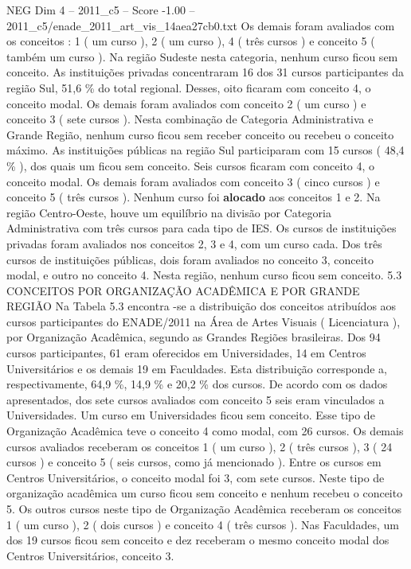 \begin{textsample}{NEG Dim 4 – 2011\_c5 – Score -1.00 – 2011\_c5/enade\_2011\_art\_vis\_14aea27cb0.txt}
Os demais foram avaliados com os conceitos : 1 ( um curso ), 2 ( um curso ), 4 ( três cursos ) e conceito 5 ( também um curso ).
Na região Sudeste nesta categoria, nenhum curso ficou sem conceito.
As instituições privadas concentraram 16 dos 31 cursos participantes da região Sul, 51,6 \% do total regional.
Desses, oito ficaram com conceito 4, o conceito modal.
Os demais foram avaliados com conceito 2 ( um curso ) e conceito 3 ( sete cursos ).
Nesta combinação de Categoria Administrativa e Grande Região, nenhum curso ficou sem receber conceito ou recebeu o conceito máximo.
As instituições públicas na região Sul participaram com 15 cursos ( 48,4 \% ), dos quais um ficou sem conceito.
Seis cursos ficaram com conceito 4, o conceito modal.
Os demais foram avaliados com conceito 3 ( cinco cursos ) e conceito 5 ( três cursos ).
Nenhum curso foi \textbf{alocado} aos conceitos 1 e 2.
Na região Centro-Oeste, houve um equilíbrio na divisão por Categoria Administrativa com três cursos para cada tipo de IES.
Os cursos de instituições privadas foram avaliados nos conceitos 2, 3 e 4, com um curso cada.
Dos três cursos de instituições públicas, dois foram avaliados no conceito 3, conceito modal, e outro no conceito 4.
Nesta região, nenhum curso ficou sem conceito. 5.3 CONCEITOS POR ORGANIZAÇÃO ACADÊMICA E POR GRANDE REGIÃO Na Tabela 5.3 encontra -se a distribuição dos conceitos atribuídos aos cursos participantes do ENADE/2011 na Área de Artes Visuais ( Licenciatura ), por Organização Acadêmica, segundo as Grandes Regiões brasileiras.
Dos 94 cursos participantes, 61 eram oferecidos em Universidades, 14 em Centros Universitários e os demais 19 em Faculdades.
Esta distribuição corresponde a, respectivamente, 64,9 \%, 14,9 \% e 20,2 \% dos cursos.
De acordo com os dados apresentados, dos sete cursos avaliados com conceito 5 seis eram vinculados a Universidades.
Um curso em Universidades ficou sem conceito.
Esse tipo de Organização Acadêmica teve o conceito 4 como modal, com 26 cursos.
Os demais cursos avaliados receberam os conceitos 1 ( um curso ), 2 ( três cursos ), 3 ( 24 cursos ) e conceito 5 ( seis cursos, como já mencionado ).
Entre os cursos em Centros Universitários, o conceito modal foi 3, com sete cursos.
Neste tipo de organização acadêmica um curso ficou sem conceito e nenhum recebeu o conceito 5.
Os outros cursos neste tipo de Organização Acadêmica receberam os conceitos 1 ( um curso ), 2 ( dois cursos ) e conceito 4 ( três cursos ).
Nas Faculdades, um dos 19 cursos ficou sem conceito e dez receberam o mesmo conceito modal dos Centros Universitários, conceito 3.

\end{textsample}
